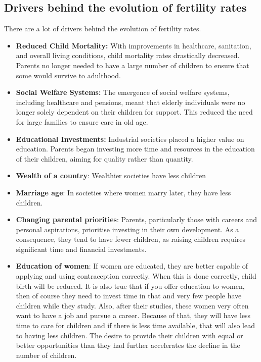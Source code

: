 \documentclass[../summary.tex]{subfiles}
\begin{document}
\subsection{Drivers behind the evolution of fertility rates}

There are a lot of drivers behind the evolution of fertility rates.

\begin{itemize}
	\item \textbf{Reduced Child Mortality:} With improvements in healthcare, sanitation, and overall living conditions, child mortality rates drastically decreased. Parents no longer needed to have a large number of children to ensure that some would survive to adulthood.
	\item \textbf{Social Welfare Systems:} The emergence of social welfare systems, including healthcare and pensions, meant that elderly individuals were no longer solely dependent on their children for support. This reduced the need for large families to ensure care in old age.
	\item \textbf{Educational Investments:} Industrial societies placed a higher value on education. Parents began investing more time and resources in the education of their children, aiming for quality rather than quantity.
	\item \textbf{Wealth of a country}: Wealthier societies have less children
	\item \textbf{Marriage age}: In societies where women marry later, they have less children.
	\item \textbf{Changing parental priorities}: Parents, particularly those with careers and personal aspirations, prioritise investing in their own development. As a consequence, they tend to have fewer children, as raising children requires significant time and financial investments.
	\item \textbf{Education of women}: If women are educated, they are better capable of applying and using contraception correctly. When this is done correctly, child birth will be reduced. It is also true that if you offer education to women, then of course they need to invest time in that and very few people have children while they study. Also, after their studies, these women very often want to have a job and pursue a career. Because of that, they will have less time to care for children and if there is less time available, that will also lead to having less children. The desire to provide their children with equal or better opportunities than they had further accelerates the decline in the number of children.
\end{itemize}
\end{document}
